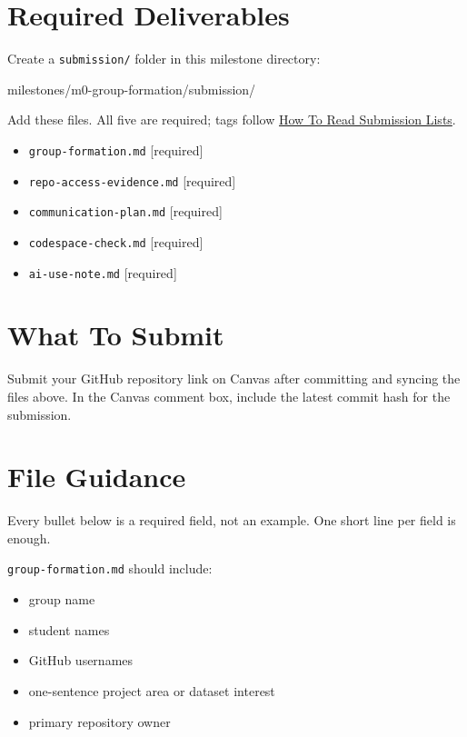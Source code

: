 \documentclass[
  letterpaper,
  DIV=11,
  numbers=noendperiod,
  oneside]{scrreprt}
\newenvironment{Shaded}{\begin{snugshade}}{\end{snugshade}}
\newcommand{\NormalTok}[1]{\textcolor[rgb]{0.00,0.23,0.31}{#1}}
\providecommand{\tightlist}{%
  \setlength{\itemsep}{0pt}\setlength{\parskip}{0pt}}
\begin{document}
\section{Required Deliverables}\label{required-deliverables}

Create a \texttt{submission/} folder in this milestone directory:

\begin{Shaded}
\begin{Highlighting}[numbers=left,,]
\NormalTok{milestones/m0{-}group{-}formation/submission/}
\end{Highlighting}
\end{Shaded}

Add these files. All five are required; tags follow
\hyperref[how-to-read-submission-lists]{How To Read Submission Lists}.

\begin{itemize}
\tightlist
\item
  \texttt{group-formation.md} {[}required{]}
\item
  \texttt{repo-access-evidence.md} {[}required{]}
\item
  \texttt{communication-plan.md} {[}required{]}
\item
  \texttt{codespace-check.md} {[}required{]}
\item
  \texttt{ai-use-note.md} {[}required{]}
\end{itemize}

\section{What To Submit}\label{what-to-submit-10}

Submit your GitHub repository link on Canvas after committing and
syncing the files above. In the Canvas comment box, include the latest
commit hash for the submission.

\section{File Guidance}\label{file-guidance}

Every bullet below is a required field, not an example. One short line
per field is enough.

\texttt{group-formation.md} should include:

\begin{itemize}
\tightlist
\item
  group name
\item
  student names
\item
  GitHub usernames
\item
  one-sentence project area or dataset interest
\item
  primary repository owner
\end{itemize}
\end{document}
